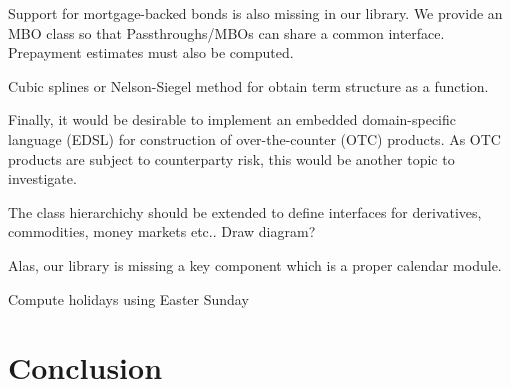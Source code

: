 Support for mortgage-backed bonds is also missing in our library. We provide an MBO class so that Passthroughs/MBOs can share a common interface. Prepayment estimates must also be computed.

Cubic splines or Nelson-Siegel method for obtain term structure as a function.

Finally, it would be desirable to implement an embedded domain-specific language (EDSL) for construction of over-the-counter (OTC) products.
As OTC products are subject to counterparty risk, this would be another topic to investigate.

The class hierarchichy should be extended to define interfaces for derivatives, commodities, money markets etc.. Draw diagram?

Alas, our library is missing a key component which is a proper calendar module.

Compute holidays using Easter Sunday

\chapter{Conclusion}
